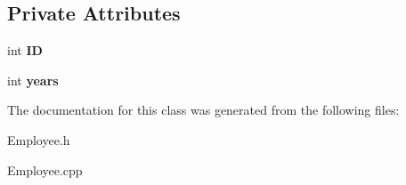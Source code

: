 \subsection*{Private Attributes}
\begin{DoxyCompactItemize}
\item 
\mbox{\label{classEmployee_a832bbae4ee8a704b917f82c4d497bbac}} 
int {\bfseries ID}
\item 
\mbox{\label{classEmployee_a3e4862d9dfc73becb459a562fa2e25f5}} 
int {\bfseries years}
\end{DoxyCompactItemize}


The documentation for this class was generated from the following files\+:\begin{DoxyCompactItemize}
\item 
Employee.\+h\item 
Employee.\+cpp\end{DoxyCompactItemize}
